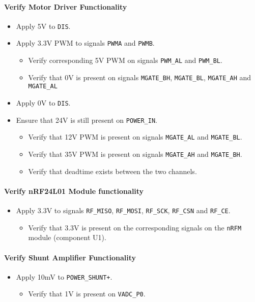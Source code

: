 \paragraph{Verify Motor Driver Functionality} %
\begin{itemize}
	\item Apply 5V to \texttt{DIS}.
	\item Apply 3.3V PWM to signals \texttt{PWMA} and \texttt{PWMB}.
	\begin{itemize}
		\item Verify corresponding 5V PWM on signals \texttt{PWM\_AL} and \texttt{PWM\_BL}.
		\item Verify that 0V is present on signals \texttt{MGATE\_BH}, \texttt{MGATE\_BL}, \texttt{MGATE\_AH} and \texttt{MGATE\_AL}
	\end{itemize}
	\item Apply 0V to \texttt{DIS}.
	\item Ensure that 24V is still present on \texttt{POWER\_IN}.
	\begin{itemize}
		\item Verify that 12V PWM is present on signals \texttt{MGATE\_AL} and \texttt{MGATE\_BL}.
		\item Verify that 35V PWM is present on signals \texttt{MGATE\_AH} and \texttt{MGATE\_BH}.
		\item Verify that deadtime exists between the two channels.
	\end{itemize}
\end{itemize}
\paragraph{Verify nRF24L01 Module functionality} %
\begin{itemize}
	\item Apply 3.3V to signals \texttt{RF\_MISO}, \texttt{RF\_MOSI}, \texttt{RF\_SCK}, \texttt{RF\_CSN} and \texttt{RF\_CE}.
	\begin{itemize}
		\item Verify that 3.3V is present on the corresponding signals on the \texttt{nRFM} module (component U1).
	\end{itemize}
\end{itemize}

\paragraph{Verify Shunt Amplifier Functionality} %
\label{par:verify_shunt_amplifier_functionality}
\begin{itemize}
	\item Apply 10mV to \texttt{POWER\_SHUNT+}.
	\begin{itemize}
		\item Verify that 1V is present on \texttt{VADC\_P0}.
	\end{itemize}
\end{itemize}
